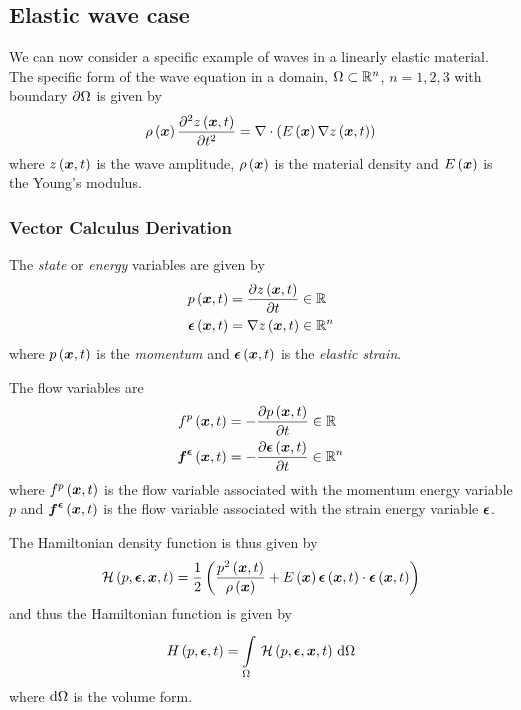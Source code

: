 \subsection{Elastic wave case}

We can now consider a specific example of waves in a linearly elastic
material. The specific form of the wave equation in a domain,
$\Omega\subset\rntopology{n}$, $n=1,2,3$ with boundary
$ \partial{\Omega} $ is given by
\begin{equation}
  \fnof{\rho}{\vectr{x}}\deltwosqby{\fnof{z}{\vectr{x},t}}{t}=\divergence{}{\pbrac{\fnof{E}{\vectr{x}}\gradient{}{\fnof{z}{\vectr{x},t}}}}
\end{equation}
where $ z\left(  \boldsymbol{x} ,t \right) $ is the wave amplitude,
$ \rho\left(  \boldsymbol{x}  \right) $ is the material density and
$ E\left(  \boldsymbol{x}  \right) $ is the Young's modulus.

\subsubsection{Vector Calculus Derivation}

The \emph{state} or \emph{energy} variables are given by
\begin{align}
    \fnof{p}{\vectr{x},t}&=\delby{\fnof{z}{\vectr{x},t}}{t}\in\rntopology{} \\
    \fnof{\vectr{\epsilon}}{\vectr{x},t}&=\gradient{}{\fnof{z}{\vectr{x},t}}\in\rntopology{n}
\end{align}
where $ p\left(  \boldsymbol{x} ,t \right) $ is the \emph{momentum} and
$  \boldsymbol{\epsilon} \left(  \boldsymbol{x} ,t \right) $ is the \emph{elastic
strain}.

The flow variables are 
\begin{align}
  \fnof{f^{p}}{\vectr{x},t}&=-\delby{\fnof{p}{\vectr{x},t}}{t}\in\rntopology{} \\
  \fnof{\vectr{f}^{\vectr{\epsilon}}}{\vectr{x},t}&=-\delby{\fnof{\vectr{\epsilon}}{\vectr{x},t}}{t}\in\rntopology{n}
\end{align}
where $ f^{p}\left(  \boldsymbol{x} ,t \right) $ is the flow variable associated with the momentum energy variable $p$ and $  \boldsymbol{f} ^{ \boldsymbol{\epsilon} }\left(  \boldsymbol{x} ,t \right) $ is the flow variable associated with the strain energy variable $ \boldsymbol{\epsilon} $.

The Hamiltonian density function is thus given by
\begin{equation}
     \mathcal{H} \left( p, \boldsymbol{\epsilon} , \boldsymbol{x} ,t \right)  =\dfrac{1}{2}\left( \dfrac{ p^{2}\left(  \boldsymbol{x} ,t \right) }{ \rho\left(  \boldsymbol{x}  \right) }+ E\left(  \boldsymbol{x}  \right)    \boldsymbol{\epsilon} \left(  \boldsymbol{x} ,t \right)   \cdot    \boldsymbol{\epsilon} \left(  \boldsymbol{x} ,t \right)   \right)
\end{equation}
and thus the Hamiltonian function is given by
\begin{equation}
  \hamiltonian{p,\vectr{\epsilon},t}=\gint{\Omega}{}{\hamiltoniandensity{p,\vectr{\epsilon},\vectr{x},t}}{\Omega}
\end{equation}
where $  { \mathrm{d} }\Omega  $ is the volume form.

